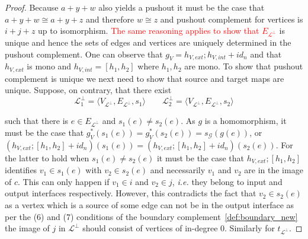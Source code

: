\begin{proof}
    Because $a + y + w$ also yields a pushout it must be the case that $a + y + w \cong a + y + z$ and therefore $w \cong z$ and pushout complement for vertices is $i + j + z$ up to isomorphism.
    \textcolor{red}{The same reasoning applies to show that $E_{\mathcal{L}^{\bot}}$} is unique and hence the sets of edges and vertices are uniquely determined in the pushout complement.
    One can observe that $g_{V} = h_{V,ext};h_{V,int} + id_{n}$ and that $h_{V,ext}$ is mono and $h_{V,int} = [h_1,h_2]$ where $h_1,h_2$ are mono.
    To show that pushout complement is unique we next need to show that source and target maps are unique.
    Suppose, on contrary, that there exist
    \[
    \mathcal{L}_{1}^{\bot} = \langle V_{\mathcal{L}^{\bot}}, E_{\mathcal{L}^{\bot}}, s_{1} \rangle \qquad \mathcal{L}_{2}^{\bot} = \langle V_{\mathcal{L}^{\bot}}, E_{\mathcal{L}^{\bot}}, s_{2} \rangle
    \]

    such that there is $e \in E_{\mathcal{L}^{\bot}}$ and $s_{1}(e) \not = s_{2}(e)$.
    As $g$ is a homomorphism, it must be the case that $g^{*}_{V}(s_{1}(e)) = g^{*}_{V}(s_{2}(e)) = s_{\mathcal{G}}(g(e))$, or
    $(h_{V,ext};[h_{1},h_{2}] + id_{n})(s_{1}(e)) = (h_{V,ext};[h_{1},h_{2}] + id_{n})(s_{2}(e))$.
    For the latter to hold when $s_{1}(e) \not = s_{2}(e)$ it must be the case that $h_{V,ext};[h_{1},h_{2}]$ identifies $v_{1} \in s_{1}(e)$ with $v_{2} \in s_{2}(e)$ and necessarily $v_{1}$ and $v_{2}$ are in the image of $c$.
    This can only happen if $v_1 \in i$ and $v_2 \in j$, \textit{i.e.} they belong to input and output interfaces respectively.
    However, this contradicts the fact that $v_2 \in s_2(e)$ as a vertex which is a source of some edge can not be in the output interface as per the (6) and (7) conditions of the boundary complement~\ref{def:boundary_new} the image of $j$ in $\mathcal{L}^{\bot}$ should consist of vertices of in-degree 0.
    Similarly for $t_{\mathcal{L}^{\bot}}$.

    

\end{proof}
